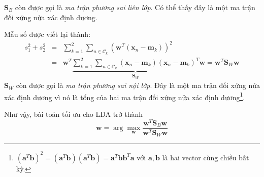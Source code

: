 $\mathbf{S}_B$ còn được gọi là \textit{ma trận phương sai liên lớp}. Có
thể thấy đây là một ma trận đối xứng nửa xác định dương.

Mẫu số được viết lại thành:
\begin{eqnarray}
\nonumber
s_1^2 + s_2^2 &=& \sum_{k=1}^2 \sum_{n \in \mathcal{C}_k} \left(\mathbf{w}^T(\mathbf{x}_n - \mathbf{m}_k)\right)^2 \\\
\label{eqn:29_6}
&=&\mathbf{w}^T \underbrace{\sum_{k=1}^2 \sum_{n \in \mathcal{C}_k} (\mathbf{x}_n - \mathbf{m}_k)(\mathbf{x}_n - \mathbf{m}_k)^T}_{\mathbf{S}_W} \mathbf{w} = \mathbf{w}^T\mathbf{S}_W \mathbf{w}
\end{eqnarray}
$\mathbf{S}_W$ còn được gọi là \textit{ma trận phương sai nội lớp}. Đây
là một ma trận đối xứng nửa xác định dương vì nó là tổng của hai ma trận
đối xứng nửa xác định dương\footnote{\begin{math}
(\mathbf{a}^T\mathbf{b})^2 = (\mathbf{a}^T\mathbf{b})(\mathbf{a}^T\mathbf{b}) = \mathbf{a}^T\mathbf{b}\mathbf{b}^T\mathbf{a}
\end{math}
với $\mathbf{a}, \mathbf{b}$ là hai vector cùng chiều bất kỳ. }.

Như vậy, bài toán tối ưu cho LDA trở thành
\begin{equation}
\label{eqn:29_7}
\mathbf{w}  = \arg\max_{\mathbf{w}}\frac{\mathbf{w}^T\mathbf{S}_B \mathbf{w}}{\mathbf{w}^T\mathbf{S}_W\mathbf{w}}
\end{equation}



